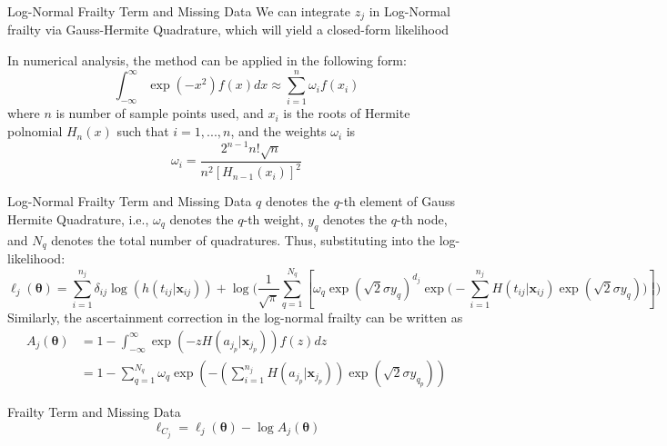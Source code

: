\documentclass [aspectratio=169]{beamer}
\begin{document}
\begin{frame}{Log-Normal Frailty Term and Missing Data} 
    We can integrate $z_j$ in Log-Normal frailty via Gauss-Hermite Quadrature, which will yield a closed-form likelihood
    \begin{definition} 
        In numerical analysis, the method can be applied in the following form:
        \begin{equation}
            \int_{-\infty}^{\infty}\exp(-x^2)f(x)dx\approx \sum_{i=1}^n\omega_i f(x_i)
        \end{equation}
        where $n$ is number of sample points used, and $x_i$ is the roots of Hermite polnomial $H_n (x)$ such that $i=1, ..., n$, and the weights $\omega_i$ is 
        \begin{equation}
            \omega_i=\frac{2^{n-1}n!\sqrt{n}}{n^2[H_{n-1}(x_i)]^2}
        \end{equation}
    \end{definition}
\end{frame}

\begin{frame}{Log-Normal Frailty Term and Missing Data}
    $q$ denotes the $q$-th element of Gauss Hermite Quadrature, i.e., $\omega_{q}$ denotes the $q$-th weight, $y_{q}$ denotes the $q$-th node, and $N_{q}$ denotes the total number of quadratures. Thus, substituting into the log-likelihood:
    \begin{equation}
        \ell_j(\boldsymbol{\theta})=\sum_{i=1}^{n_j}\delta_{ij}\log(h(t_{ij}|\mathbf{x}_{ij}))+\log\Big (\frac{1}{\sqrt{\pi}}\sum_{q=1}^{N_{q}}\left [\omega_{q}\exp(\sqrt{2}\sigma y_{q})^{d_j}\exp\Big (-\sum_{i=1}^{n_j}H(t_{ij}|\mathbf{x}_{ij})\exp(\sqrt{2}\sigma y_{q})\Big )\right ]\Big )
    \end{equation}
    Similarly, the ascertainment correction in the log-normal frailty can be written as 
    \begin{align}
        A_j(\boldsymbol{\theta})&=1-\int_{-\infty}^{\infty} \exp(-z H(a_{j_p}|\mathbf{x}_{j_p}))f(z)dz\\
        &=1-\sum_{q=1}^{N_{q}}\omega_{q} \exp\left (-(\sum_{i=1}^{n_j} H(a_{j_p}|\mathbf{x}_{j_p}))\exp (\sqrt{2}\sigma y_{q_p})\right )
    \end{align}
\end{frame}

\begin{frame}{Frailty Term and Missing Data}
    \begin{equation} 
        \ell_{C_{j}}=\ell_j(\boldsymbol{\theta})-\log A_j(\boldsymbol{\theta})
    \end{equation}
\end{frame}
\end{document}
